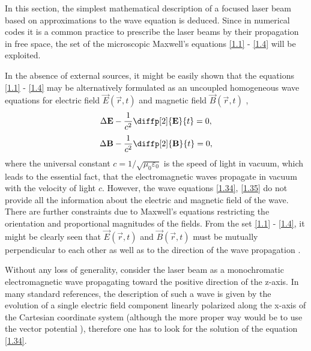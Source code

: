 In this section, the simplest mathematical description of a focused laser beam based on approximations to the wave equation is deduced. Since in numerical codes it is a common practice to prescribe the laser beams by their propagation in free space, the set of the microscopic Maxwell's equations \ref{1.1} - \ref{1.4} will be exploited.

In the absence of external sources, it might be easily shown that the equations \ref{1.1} - \ref{1.4} may be alternatively formulated as an uncoupled homogeneous wave equations for electric field $ \vec{E}\left( \vec{r}, t \right) $ and magnetic field $ \vec{B}\left( \vec{r}, t \right) $ \cite{Feynman1963},
\begin{equation}
\label{1.34}
\laplace{\vec{E}} - \frac{1}{c^{2}} \diffp[2]{\vec{E}}{t} = 0,
\end{equation}
\begin{equation}
\label{1.35}
\laplace{\vec{B}} - \frac{1}{c^{2}} \diffp[2]{\vec{B}}{t} = 0,
\end{equation}
where the universal constant $ c = 1/\sqrt{\mu_0 \varepsilon_0} $ is the speed of light in vacuum, which leads to the essential fact, that the electromagnetic waves propagate in vacuum with the velocity of light $ c $. However, the wave equations \ref{1.34}, \ref{1.35} do not provide all the information about the electric and magnetic field of the wave. There are further constraints due to Maxwell's equations restricting the orientation and proportional magnitudes of the fields. From the set \ref{1.1} - \ref{1.4}, it might be clearly seen that $ \vec{E}\left( \vec{r}, t \right) $ and $ \vec{B}\left( \vec{r}, t \right) $ must be mutually perpendicular to each other as well as to the direction of the wave propagation \cite{Stratton2007}. 

Without any loss of generality, consider the laser beam as a monochromatic electromagnetic wave propagating toward the positive direction of the z-axis. In many standard references, the description of such a wave is given by the evolution of a single electric field component linearly polarized along the x-axis of the Cartesian coordinate system \cite{Siegman1986, Milonni1988, Yariv1989, Svelto2010, Galvez2006} (although the more proper way would be to use the vector potential \cite{Davis1979, Davis1981, Guenther1990, Salamin2006, Vaveliuk2007}), therefore one has to look for the solution of the equation \ref{1.34}. 

